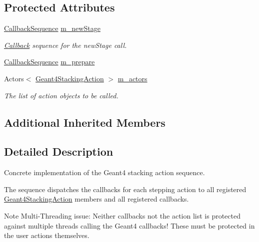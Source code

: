 \subsection*{Protected Attributes}
\begin{DoxyCompactItemize}
\item 
\hyperlink{struct_d_d4hep_1_1_callback_sequence}{Callback\+Sequence} \hyperlink{class_d_d4hep_1_1_simulation_1_1_geant4_stacking_action_sequence_a9a67c9ae5d00befcdfaa81dfcac6dfb1}{m\+\_\+new\+Stage}
\begin{DoxyCompactList}\small\item\em \hyperlink{class_d_d4hep_1_1_callback}{Callback} sequence for the new\+Stage call. \end{DoxyCompactList}\item 
\hyperlink{struct_d_d4hep_1_1_callback_sequence}{Callback\+Sequence} \hyperlink{class_d_d4hep_1_1_simulation_1_1_geant4_stacking_action_sequence_a5e1405fee094690bb84d74c38b619bbc}{m\+\_\+prepare}
\item 
Actors$<$ \hyperlink{class_d_d4hep_1_1_simulation_1_1_geant4_stacking_action}{Geant4\+Stacking\+Action} $>$ \hyperlink{class_d_d4hep_1_1_simulation_1_1_geant4_stacking_action_sequence_af1288d59daee21aca2f409b9dc629a04}{m\+\_\+actors}
\begin{DoxyCompactList}\small\item\em The list of action objects to be called. \end{DoxyCompactList}\end{DoxyCompactItemize}
\subsection*{Additional Inherited Members}


\subsection{Detailed Description}
Concrete implementation of the Geant4 stacking action sequence. 

The sequence dispatches the callbacks for each stepping action to all registered \hyperlink{class_d_d4hep_1_1_simulation_1_1_geant4_stacking_action}{Geant4\+Stacking\+Action} members and all registered callbacks.

Note Multi-\/\+Threading issue\+: Neither callbacks not the action list is protected against multiple threads calling the Geant4 callbacks! These must be protected in the user actions themselves.

